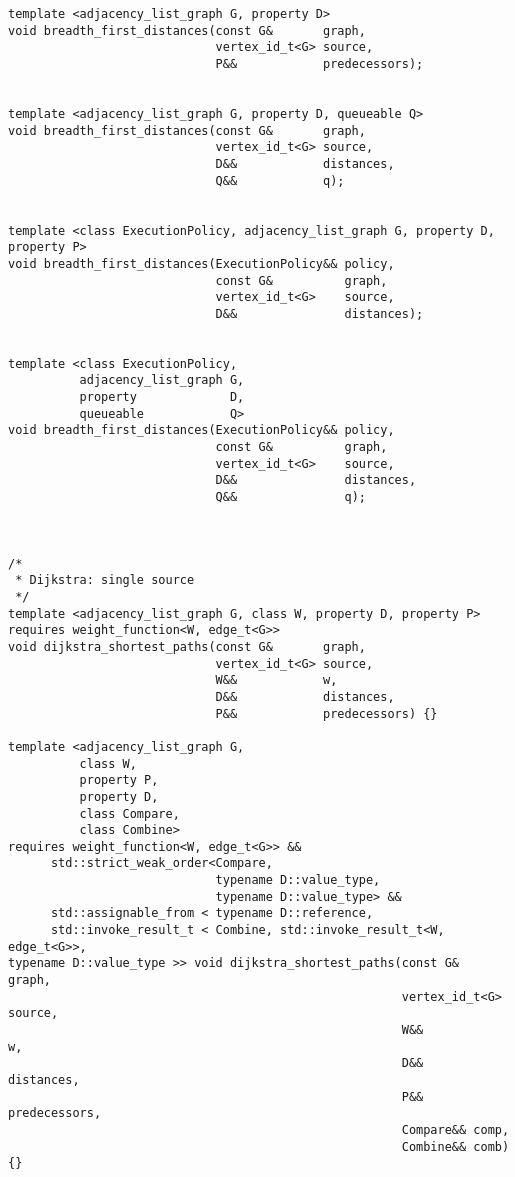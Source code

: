 \begin{lstlisting}
template <adjacency_list_graph G, property D>
void breadth_first_distances(const G&       graph,
                             vertex_id_t<G> source,
                             P&&            predecessors);


template <adjacency_list_graph G, property D, queueable Q>
void breadth_first_distances(const G&       graph,
                             vertex_id_t<G> source,
                             D&&            distances,
                             Q&&            q);


template <class ExecutionPolicy, adjacency_list_graph G, property D, property P>
void breadth_first_distances(ExecutionPolicy&& policy,
                             const G&          graph,
                             vertex_id_t<G>    source,
                             D&&               distances);


template <class ExecutionPolicy,
          adjacency_list_graph G,
          property             D,
          queueable            Q>
void breadth_first_distances(ExecutionPolicy&& policy,
                             const G&          graph,
                             vertex_id_t<G>    source,
                             D&&               distances,
                             Q&&               q);



/*
 * Dijkstra: single source
 */
template <adjacency_list_graph G, class W, property D, property P>
requires weight_function<W, edge_t<G>>
void dijkstra_shortest_paths(const G&       graph,
                             vertex_id_t<G> source,
                             W&&            w,
                             D&&            distances,
                             P&&            predecessors) {}

template <adjacency_list_graph G,
          class W,
          property P,
          property D,
          class Compare,
          class Combine>
requires weight_function<W, edge_t<G>> &&
      std::strict_weak_order<Compare,
                             typename D::value_type,
                             typename D::value_type> &&
      std::assignable_from < typename D::reference,
      std::invoke_result_t < Combine, std::invoke_result_t<W, edge_t<G>>,
typename D::value_type >> void dijkstra_shortest_paths(const G&       graph,
                                                       vertex_id_t<G> source,
                                                       W&&            w,
                                                       D&&       distances,
                                                       P&&       predecessors,
                                                       Compare&& comp,
                                                       Combine&& comb) {}



\end{lstlisting}
